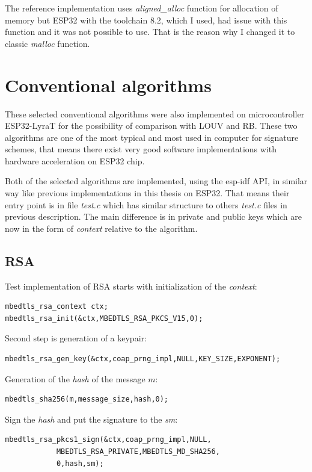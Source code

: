 \documentclass[thesis=M,english]{FITthesis}[2019/12/23]
\begin{document}
\bigskip
\noindent
The reference implementation uses \textit{aligned\_alloc} function for allocation of memory but ESP32 with the toolchain 8.2, which I used, had issue with this function and it was not possible to use. That is the reason why I changed it to classic \textit{malloc} function.

\newpage
\section{Conventional algorithms}
These selected conventional algorithms were also implemented on microcontroller ESP32-LyraT for the possibility of comparison with LOUV and RB. These two algorithms are one of the most typical and most used in computer for signature schemes, that means there exist very good software implementations with hardware acceleration on ESP32 chip. 

\bigskip
\noindent
Both of the selected algorithms are implemented, using the esp-idf API, in similar way like previous implementations in this thesis on ESP32. That means their entry point is in file \textit{test.c} which has similar structure to others \textit{test.c} files in previous description. The main difference is in private and public keys which are now in the form of \textit{context} relative to the algorithm.

\subsection{RSA}
Test implementation of RSA starts with initialization of the \textit{context}:
\begin{lstlisting}[frame=single]
mbedtls_rsa_context ctx;
mbedtls_rsa_init(&ctx,MBEDTLS_RSA_PKCS_V15,0);
\end{lstlisting}

\noindent
Second step is generation of a keypair:
\begin{lstlisting}[frame=single]
mbedtls_rsa_gen_key(&ctx,coap_prng_impl,NULL,KEY_SIZE,EXPONENT);
\end{lstlisting}

\noindent
Generation of the \textit{hash} of the message $m$:
\begin{lstlisting}[frame=single]
mbedtls_sha256(m,message_size,hash,0);
\end{lstlisting}

\noindent
Sign the \textit{hash} and put the signature to the \textit{sm}:
\begin{lstlisting}[frame=single]
mbedtls_rsa_pkcs1_sign(&ctx,coap_prng_impl,NULL,
			MBEDTLS_RSA_PRIVATE,MBEDTLS_MD_SHA256,
			0,hash,sm);
\end{lstlisting}
\end{document}
